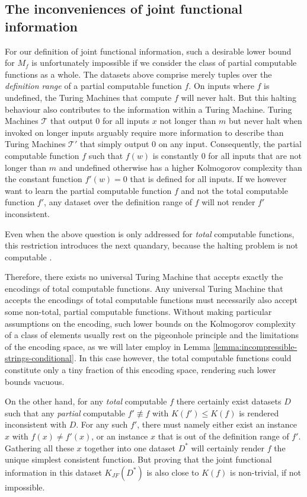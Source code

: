 \subsection{The inconveniences of joint functional information}
\label{sec:inconvenience-joint-functional-information}
For our definition of joint functional information, such a desirable lower bound for $M_f$ is unfortunately impossible if we consider the class of partial computable functions as a whole. 
The datasets above comprise merely tuples over the \textit{definition range} of a partial computable function $f$.
On inputs where $f$ is undefined, the Turing Machines that compute $f$ will never halt.
But this halting behaviour also contributes to the information within a Turing Machine.
Turing Machines $\mathcal{T}$ that output $0$ for all inputs $x$ not longer than $m$ but never halt when invoked on longer inputs arguably require more information to describe than Turing Machines $\mathcal{T}'$ that simply output $0$ on any input.
Consequently, the partial computable function $f$ such that $f(w)$ is constantly $0$ for all inputs that are not longer than $m$ and undefined otherwise has a higher Kolmogorov complexity than the constant function $f'(w)=0$ that is defined for all inputs.
If we however want to learn the partial computable function $f$ and not the total computable function $f'$, any dataset over the definition range of $f$ will not render $f'$ inconsistent.

Even when the above question is only addressed for \textit{total} computable functions, this restriction introduces the next quandary, because the halting problem is not computable \cite{chaitin1974information}. 

Therefore, there exists no universal Turing Machine that accepts exactly the encodings of total computable functions.
Any universal Turing Machine that accepts the encodings of total computable functions must necessarily also accept some non-total, partial computable functions.
Without making particular assumptions on the encoding, such lower bounds on the Kolmogorov complexity of a class of elements usually rest on the pigeonhole principle and the limitations of the encoding space, as we will later employ in Lemma \ref{lemma:incompressible-strings-conditional}.
In this case however, the total computable functions could constitute only a tiny fraction of this encoding space, rendering such lower bounds vacuous.

\label{text:discriminative-dataset}
On the other hand, for any \textit{total} computable $f$ there certainly exist datasets $D$ such that any \textit{partial} computable $f'\not\equiv f$ with $K(f')\leq K(f)$ is rendered inconsistent with $D$.
For any such $f'$, there must namely either exist an instance $x$ with $f(x)\neq f'(x)$, or an instance $x$ that is out of the definition range of $f'$.
Gathering all these $x$ together into one dataset $D^{*}$ will certainly render $f$ the unique simplest consistent function.
But proving that the joint functional information in this dataset $K_{JF}(D^{*})$ is also close to $K(f)$ is non-trivial, if not impossible.

